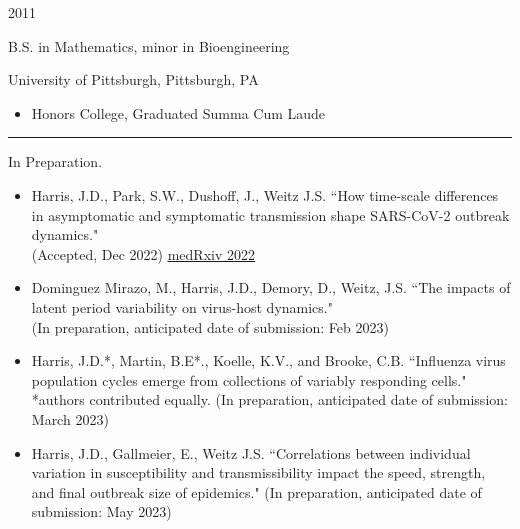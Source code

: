 \documentclass[a4paper,10pt]{article}
\newlength{\cvcolumngapwidth}
\newlength{\cvleftcolumnwidth}
\newlength{\cvrightcolumnwidth}
\newcommand{\cvsectionstyle}[1]{{\normalsize\cvsectionfont\textcolor{cvsectioncolor}{#1}}}
\newcommand{\cvtitlestyle}[1]{{\large\cvtitlefont\textcolor{cvtitlecolor}{#1}}}
\newcommand{\cvdurationstyle}[1]{{\small\cvdurationfont\textcolor{cvdurationcolor}{#1}}}
\newlength{\cvafteritemskipamount}
\newlength{\cvaftersectionskipamount}
\newlength{\cvbetweensectionandheadingextraskipamount}
\newlength{\cvaftertitleskipamount}
\newlength{\cvparskip}
\newcommand{\cvsection}[1]{
            \begin{minipage}[t]{\cvleftcolumnwidth}
                \raggedleft\cvsectionstyle{#1}
            \end{minipage}%
            \hspace{\cvcolumngapwidth}%
            \begin{minipage}[t]{\cvrightcolumnwidth}
                \textcolor{cvrulecolor}{\rule{\cvrightcolumnwidth}{0.3mm}}
            \end{minipage}
        
            \vspace{\cvaftersectionskipamount}
        }
\newcommand{\cvitem}[2]{
            \begin{minipage}[t]{\cvleftcolumnwidth}
                \raggedleft #1
            \end{minipage}%
            \hspace{\cvcolumngapwidth}%
            \begin{minipage}[t]{\cvrightcolumnwidth}
                \setlength{\parskip}{\cvparskip} #2
            \end{minipage}
        
            \vspace{\cvafteritemskipamount}
        }
\newcommand{\cvtitle}[1]{
            \cvtitlestyle{#1}
        
            \vspace{\cvaftertitleskipamount}
            \vspace{-\cvparskip}
        }
\begin{document}
        \cvitem{
            \cvdurationstyle{2011}
        }{
            \cvtitle{B.S. in Mathematics, minor in Bioengineering}
        	University of Pittsburgh, Pittsburgh, PA
            \begin{itemize}[leftmargin=*]
                \item  Honors College, Graduated Summa Cum Laude
            \end{itemize}
        }
        
        \cvsection{PUBLICATIONS}
        
        \cvitem{
            \cvdurationstyle{In Preparation.}
        }{
            \begin{itemize}[leftmargin=*]
            	\item Harris, J.D., Park, S.W., Dushoff, J., Weitz J.S. ``How time-scale differences in asymptomatic and symptomatic transmission shape SARS-CoV-2 outbreak dynamics." \\ (Accepted, Dec 2022)
	\href{https://www.medrxiv.org/content/10.1101/2022.04.21.22274139.abstract}{\underline{medRxiv 2022}}
	\newpage
	
	        	\item Dominguez Mirazo, M., Harris, J.D., Demory, D., Weitz, J.S. ``The impacts of latent period variability on virus-host dynamics." \\ (In preparation, anticipated date of submission: Feb 2023)	
		\item Harris, J.D.*, Martin, B.E*., Koelle, K.V., and Brooke, C.B. ``Influenza virus population cycles emerge from collections of variably responding cells." *authors contributed equally. (In preparation, anticipated date of submission: March 2023)
		
		\item Harris, J.D., Gallmeier, E., Weitz J.S. ``Correlations between individual variation in susceptibility and transmissibility impact the speed, strength, and final outbreak size of epidemics." (In preparation, anticipated date of submission: May 2023)
			
	 \end{itemize}
	}    	
	
\end{document}
